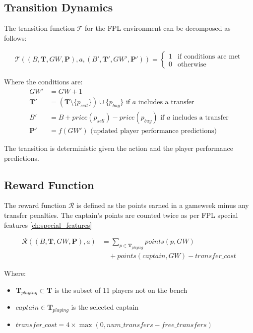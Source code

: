 \subsection{Transition Dynamics}

The transition function $\mathcal{T}$ for the FPL environment can be decomposed as follows:

\begin{align}
\mathcal{T}((B, \mathbf{T}, GW, \mathbf{P}), a, (B', \mathbf{T}', GW', \mathbf{P}')) = 
\begin{cases}
1 & \text{if conditions are met} \\
0 & \text{otherwise}
\end{cases}
\end{align}

Where the conditions are:
\begin{align}
GW' &= GW + 1\\
\mathbf{T}' &= (\mathbf{T} \setminus \{p_{sell}\}) \cup \{p_{buy}\} \text{ if } a \text{ includes a transfer}\\
B' &= B + price(p_{sell}) - price(p_{buy}) \text{ if } a \text{ includes a transfer}\\
\mathbf{P}' &= f(GW') \text{ (updated player performance predictions)}
\end{align}

The transition is deterministic given the action and the player performance predictions.

\subsection{Reward Function}

The reward function $\mathcal{R}$ is defined as the points earned in a gameweek minus any transfer penalties. The captain's points are counted twice as per FPL special features \ref{ch:special_features}

\begin{align}
\mathcal{R}((B, \mathbf{T}, GW, \mathbf{P}), a) &= \sum_{p \in \mathbf{T}_{playing}} points(p, GW) \nonumber \\
&\quad + points(captain, GW) - transfer\_cost
\end{align}

Where:
\begin{itemize}
    \item $\mathbf{T}_{playing} \subset \mathbf{T}$ is the subset of 11 players not on the bench
    \item $captain \in \mathbf{T}_{playing}$ is the selected captain
    \item $transfer\_cost = 4 \times \max(0, num\_transfers - free\_transfers)$
\end{itemize}


